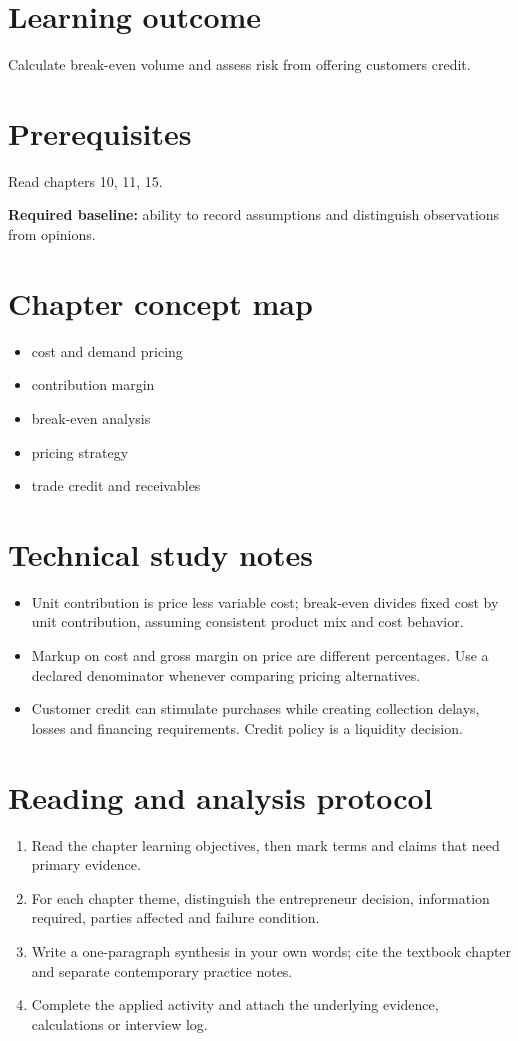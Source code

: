 \documentclass[11pt,letterpaper]{article}
\begin{document}
\SuiteOpen
\section{Learning outcome}
Calculate break-even volume and assess risk from offering customers credit.
\section{Prerequisites}
Read chapters 10, 11, 15.\par\textbf{Required baseline:} ability to record assumptions and distinguish observations from opinions.
\section{Chapter concept map}
\begin{itemize}[leftmargin=*,itemsep=3pt]
\item cost and demand pricing
\item contribution margin
\item break-even analysis
\item pricing strategy
\item trade credit and receivables
\end{itemize}

\section{Technical study notes}
\begin{itemize}[leftmargin=*,itemsep=3pt]
\item Unit contribution is price less variable cost; break-even divides fixed cost by unit contribution, assuming consistent product mix and cost behavior.
\item Markup on cost and gross margin on price are different percentages. Use a declared denominator whenever comparing pricing alternatives.
\item Customer credit can stimulate purchases while creating collection delays, losses and financing requirements. Credit policy is a liquidity decision.
\end{itemize}

\section{Reading and analysis protocol}
\begin{enumerate}[leftmargin=*,itemsep=5pt]
\item Read the chapter learning objectives, then mark terms and claims that need primary evidence.
\item For each chapter theme, distinguish the entrepreneur decision, information required, parties affected and failure condition.
\item Write a one-paragraph synthesis in your own words; cite the textbook chapter and separate contemporary practice notes.
\item Complete the applied activity and attach the underlying evidence, calculations or interview log.
\end{enumerate}
\end{document}
